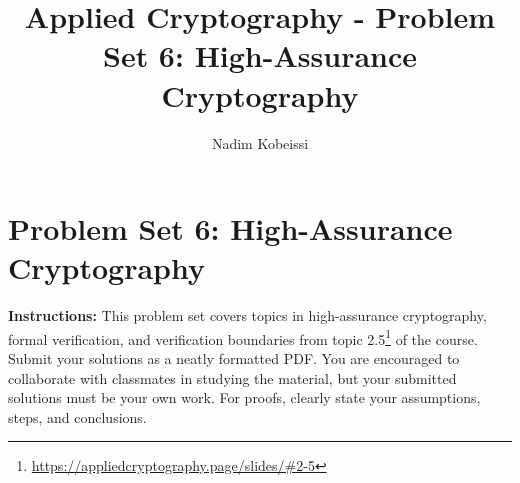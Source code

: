 \documentclass[10pt,a4paper,american]{exam}
\title{Applied Cryptography - Problem Set 6: High-Assurance Cryptography}
\author{Nadim Kobeissi}
\begin{document}
\classhandoutheader
\section*{Problem Set 6: High-Assurance Cryptography}

\begin{tcolorbox}[colframe=OliveGreen!30!white,colback=OliveGreen!5!white]
	\textbf{Instructions:} This problem set covers topics in high-assurance cryptography, formal verification, and verification boundaries from topic 2.5\footnote{\url{https://appliedcryptography.page/slides/\#2-5}} of the course. Submit your solutions as a neatly formatted PDF. You are encouraged to collaborate with classmates in studying the material, but your submitted solutions must be your own work. For proofs, clearly state your assumptions, steps, and conclusions.
\end{tcolorbox}
\end{document}

